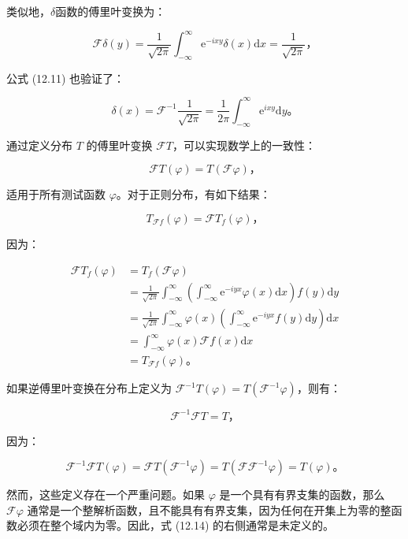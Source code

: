 类似地，$\delta$函数的傅里叶变换为：

\begin{equation}\label{eq:12.12} 
 \mathcal{F} \delta(y)=\frac{1}{\sqrt{2 \pi}} \int_{-\infty}^\infty \mathrm{e}^{-i x y} \delta(x) \mathrm{d}x = \frac{1}{\sqrt{2 \pi}}， 
 \end{equation}

公式 (12.11) 也验证了：

\begin{equation}\label{eq:12.13} 
 \delta(x) = \mathcal{F}^{-1} \frac{1}{\sqrt{2 \pi}} = \frac{1}{2 \pi} \int_{-\infty}^\infty \mathrm{e}^{i x y} \mathrm{d}y。 
 \end{equation}

通过定义分布 $T$ 的傅里叶变换
$\mathcal{F} T$，可以实现数学上的一致性：

\begin{equation}\label{eq:12.14} 
 \mathcal{F} T(\varphi)=T(\mathcal{F} \varphi)， 
 \end{equation}

适用于所有测试函数 $\varphi$。对于正则分布，有如下结果：

$$
T_{\mathcal{F} f}(\varphi) = \mathcal{F} T_f(\varphi)，
$$

因为：

$$
\begin{aligned}
\mathcal{F} T_f(\varphi) & = T_f(\mathcal{F} \varphi) \\
& = \frac{1}{\sqrt{2 \pi}} \int_{-\infty}^\infty \left(\int_{-\infty}^\infty \mathrm{e}^{-i y x} \varphi(x) \mathrm{d}x \right) f(y) \mathrm{d}y \\
& = \frac{1}{\sqrt{2 \pi}} \int_{-\infty}^\infty \varphi(x) \left(\int_{-\infty}^\infty \mathrm{e}^{-i y x} f(y) \mathrm{d}y \right) \mathrm{d}x \\
& = \int_{-\infty}^\infty \varphi(x) \mathcal{F} f(x) \mathrm{d}x \\
& = T_{\mathcal{F} f}(\varphi)。
\end{aligned}
$$

如果逆傅里叶变换在分布上定义为
$\mathcal{F}^{-1} T(\varphi)=T\left(\mathcal{F}^{-1} \varphi\right)$，则有：

$$
\mathcal{F}^{-1} \mathcal{F} T = T，
$$

因为：

$$
\mathcal{F}^{-1} \mathcal{F} T(\varphi) = \mathcal{F} T\left(\mathcal{F}^{-1} \varphi\right) = T\left(\mathcal{F F}^{-1} \varphi\right) = T(\varphi)。
$$

然而，这些定义存在一个严重问题。如果 $\varphi$
是一个具有有界支集的函数，那么 $\mathcal{F} \varphi$
通常是一个整解析函数，且不能具有有界支集，因为任何在开集上为零的整函数必须在整个域内为零。因此，式
(12.14) 的右侧通常是未定义的。

